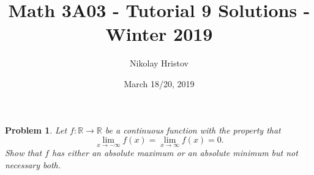 \documentclass[11pt]{article}
\theoremstyle{plain}
\newtheorem{problem}{Problem}
\theoremstyle{remark}
\newcommand {\mbR} {\mathbb R}
\begin{document}
	\title{Math 3A03 - Tutorial 9 Solutions - Winter 2019}
	\author{Nikolay Hristov}
	\date{March 18/20, 2019}
	\maketitle
	


\begin{problem}
	Let $f:\mbR \to \mbR$ be a continuous function with the property that 
	\begin{equation}
	\label{limits}
	\lim_{x\to -\infty} f(x) = \lim_{x\to \infty} f(x) = 0.
	\end{equation}
	Show that $f$ has either an absolute maximum or an absolute minimum but not necessary both.
\end{problem}
\end{document}
